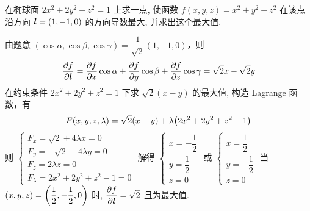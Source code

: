 \begin{example}
    在椭球面 $2x^2+2y^2+z^2=1$ 上求一点, 使函数 $f(x,y,z)=x^2+y^2+z^2$ 在该点沿方向 $\vb*{l}=(1,-1,0)$ 的方向导数最大, 并求出这个最大值.
\end{example}
\begin{solution}
    由题意 $(\cos\alpha,\cos\beta,\cos\gamma)=\dfrac{1}{\sqrt{2}}(1,-1,0)$，则 
    $$
    \pdv{f}{\vb*{l}}=\pdv{f}{x}\cos\alpha+\pdv{f}{y}\cos\beta+\pdv{f}{z}\cos\gamma=\sqrt{2}x-\sqrt{2}y
    $$
    在约束条件 $2x^2+2y^2+z^2=1$ 下求 $\sqrt{2}(x-y)$ 的最大值, 构造 Lagrange 函数，有 
    $$
    F(x, y, z,\lambda)=\sqrt{2}(x-y)+\lambda\qty(2x^2+2y^2+z^2-1)
    $$
    则 $ \begin{cases}
        F_{x}=\sqrt{2}+4\lambda x=0\\ 
        F_{y}=-\sqrt{2}+4\lambda y=0\\ 
        F_{z}=2\lambda z=0\\ 
        F_{\lambda}=2x^2+2y^2+z^2-1=0
    \end{cases} $ 解得 $ \begin{cases}
        x=-\dfrac{1}{2}\\y=\dfrac{1}{2}\\ z=0
    \end{cases} $ 或 $ \begin{cases}
        x=\dfrac{1}{2}\\ y=-\dfrac{1}{2}\\ z=0
    \end{cases} $ 当 $(x,y,z)=\qty(\dfrac{1}{2},-\dfrac{1}{2},0)$ 时, $ \displaystyle \pdv{f}{\vb*{l}}=\sqrt{2} $ 且为最大值.
\end{solution}

